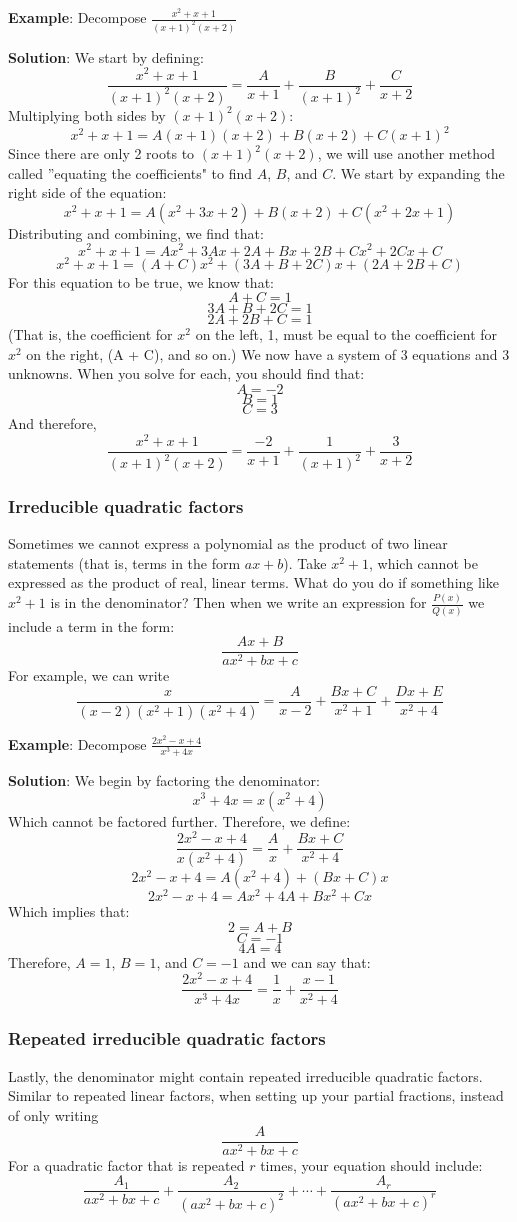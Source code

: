 \textbf{Example}: Decompose $\frac{x^2 + x + 1}{(x + 1)^2 (x + 2)}$

\textbf{Solution}: We start by defining:
$$\frac{x^2 + x + 1}{(x + 1)^2 (x + 2)} = \frac{A}{x + 1} + \frac{B}{(x + 1)^
2} + \frac{C}{x + 2}$$
Multiplying both sides by $(x + 1)^2 (x + 2)$:
$$x^2 + x + 1 = A(x + 1)(x + 2) + B(x + 2) + C(x + 1)^2$$
Since there are only 2 roots to $(x + 1)^2 (x + 2)$, we will use another 
method called ''equating the coefficients" to find $A$, $B$, and $C$. We start 
by expanding the right side of the equation:
$$x^2 + x + 1 = A(x^2 + 3x + 2) + B(x + 2) + C(x^2 + 2x + 1)$$
Distributing and combining, we find that:
$$x^2 + x + 1 = Ax^2 + 3Ax + 2A + Bx + 2B + Cx^2 + 2Cx + C$$
$$x^2 + x + 1 = (A + C)x^2 + (3A + B + 2C)x + (2A + 2B + C)$$
For this equation to be true, we know that:
$$A + C = 1$$
$$3A + B + 2C = 1$$
$$2A + 2B + C = 1$$
(That is, the coefficient for $x^2$ on the left, 1, must be equal to the 
coefficient for $x^2$ on the right, (A + C), and so on.) We now have a system 
of 3 equations and 3 unknowns. When you solve for each, you should find that:
$$A = -2$$
$$B = 1$$
$$C = 3$$
And therefore, 
$$\frac{x^2 + x + 1}{(x + 1)^2 (x + 2)} = \frac{-2}{x + 1} + \frac{1}{(x + 1)^
2} + \frac{3}{x + 2}$$

\subsubsection{Irreducible quadratic factors}
Sometimes we cannot express a polynomial as the product of two linear 
statements (that is, terms in the form $ax + b$). Take $x^2 + 1$, which 
cannot be expressed as the product of real, linear terms. What do you do 
if something like $x^2 + 1$ is in the denominator? Then when we write an 
expression for $\frac{P(x)}{Q(x)}$ we include a term in the form:
$$\frac{Ax + B}{ax^2 + bx + c}$$
For example, we can write
$$\frac{x}{(x - 2)(x^2 + 1)(x^2 + 4)} = \frac{A}{x - 2} + \frac{Bx + C}{x^2 + 1} 
+ \frac{Dx + E}{x^2 + 4}$$

\textbf{Example}: Decompose $\frac{2x^2 - x + 4}{x^3 + 4x}$

\textbf{Solution}: We begin by factoring the denominator:
$$x^3 + 4x = x(x^2 + 4)$$
Which cannot be factored further. Therefore, we define:
$$\frac{2x^2 - x + 4}{x(x^2 + 4)} = \frac{A}{x} + \frac{Bx + C}{x^2 + 4}$$
$$2x^2 - x + 4 = A(x^2 + 4) + (Bx + C)x$$
$$2x^2 - x + 4 = Ax^2 + 4A + Bx^2 + Cx$$
Which implies that:
$$2 = A + B$$
$$C = -1$$
$$4A = 4$$
Therefore, $A = 1$, $B = 1$, and $C = -1$ and we can say that:
$$\frac{2x^2 - x + 4}{x^3 + 4x} = \frac{1}{x} + \frac{x - 1}{x^2 + 4}$$

\subsubsection{Repeated irreducible quadratic factors}
Lastly, the denominator might contain repeated irreducible quadratic factors. 
Similar to repeated linear factors, when setting up your partial fractions, 
instead of only writing 
$$\frac{A}{ax^2 + bx + c}$$
For a quadratic factor that is repeated $r$ times, your equation should include:
$$\frac{A_1}{ax^2 + bx + c} + \frac{A_2}{(ax^2 + bx + c)^2} + \cdots + 
\frac{A_r}{(ax^2 + bx + c)^r}$$